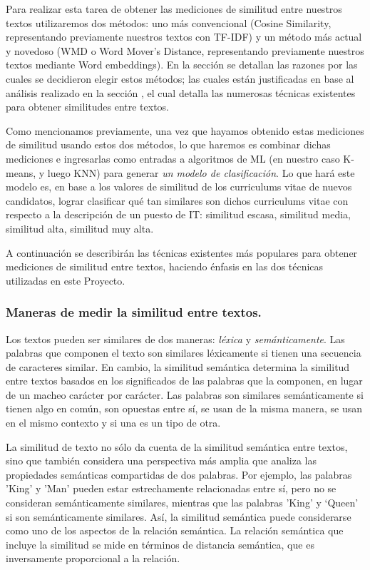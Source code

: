 \documentclass[12pt,a4paper]{article}
\begin{document}
\begin{sloppypar}
Para realizar esta tarea de obtener las mediciones de similitud entre nuestros textos utilizaremos dos métodos: uno más convencional (Cosine Similarity, representando previamente nuestros textos con TF-IDF) y un método más actual y novedoso (WMD o Word Mover’s Distance, representando previamente nuestros textos mediante Word embeddings). En la sección \textit{} se detallan las razones por las cuales se decidieron elegir estos métodos; las cuales están justificadas en base al análisis realizado en la sección \textit{}, el cual detalla las numerosas técnicas existentes para obtener similitudes entre textos.

Como mencionamos previamente, una vez que hayamos obtenido estas mediciones de similitud usando estos dos métodos, lo que haremos es combinar dichas mediciones e ingresarlas como entradas a algoritmos de ML (en nuestro caso K-means, y luego KNN) para generar \textit{un modelo de clasificación}. Lo que hará este modelo es, en base a los valores de similitud de los curriculums vitae de nuevos candidatos, lograr clasificar qué tan similares son dichos curriculums vitae con respecto a la descripción de un puesto de IT: similitud escasa, similitud media, similitud alta, similitud muy alta.

A continuación se describirán las técnicas existentes más populares para obtener mediciones de similitud entre textos, haciendo énfasis en las dos técnicas utilizadas en este Proyecto. 
\\

\subsubsection{Maneras de medir la similitud entre textos.}\label{Tecnicas_Simil_textos}

Los textos pueden ser similares de dos maneras: \textit{léxica} y \textit{semánticamente}. Las palabras que componen el texto son similares léxicamente si tienen una secuencia de caracteres similar. En cambio, la similitud semántica determina la similitud entre textos basados en los significados de las palabras que la componen, en lugar de un macheo carácter por carácter. Las palabras son similares semánticamente si tienen algo en común, son opuestas entre sí, se usan de la misma manera, se usan en el mismo contexto y si una es un tipo de otra\cite{NLP_16}.

La similitud de texto no sólo da cuenta de la similitud semántica entre textos, sino que también considera una perspectiva más amplia que analiza las propiedades semánticas compartidas de dos palabras. Por ejemplo, las palabras 'King' y 'Man' pueden estar estrechamente relacionadas entre sí, pero no se consideran semánticamente similares, mientras que las palabras 'King' y ‘Queen' si son semánticamente similares. Así, la similitud semántica puede considerarse como uno de los aspectos de la relación semántica. La relación semántica que incluye la similitud se mide en términos de distancia semántica, que es inversamente proporcional a la relación\cite{similarity_survey}.


\end{sloppypar}
\end{document}
